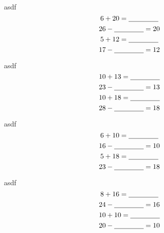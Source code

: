 \documentclass[letter, grid,frame,backs]{flashcards}
\begin{document}
\begin{flashcard}{asdf}
\Huge
\center
\vspace*{-0.8in}
\[ 6 + 20 = \underline{\hspace{1.5cm}} 
\]
\[
26 - \underline{\hspace{1.5cm}} = 20
\]\[ 5 + 12 = \underline{\hspace{1.5cm}} 
\]
\[
17 - \underline{\hspace{1.5cm}} = 12
\]
\end{flashcard}
\begin{flashcard}{asdf}
\Huge
\center
\vspace*{-0.8in}
\[ 10 + 13 = \underline{\hspace{1.5cm}} 
\]
\[
23 - \underline{\hspace{1.5cm}} = 13
\]\[ 10 + 18 = \underline{\hspace{1.5cm}} 
\]
\[
28 - \underline{\hspace{1.5cm}} = 18
\]
\end{flashcard}
\begin{flashcard}{asdf}
\Huge
\center
\vspace*{-0.8in}
\[ 6 + 10 = \underline{\hspace{1.5cm}} 
\]
\[
16 - \underline{\hspace{1.5cm}} = 10
\]\[ 5 + 18 = \underline{\hspace{1.5cm}} 
\]
\[
23 - \underline{\hspace{1.5cm}} = 18
\]
\end{flashcard}
\begin{flashcard}{asdf}
\Huge
\center
\vspace*{-0.8in}
\[ 8 + 16 = \underline{\hspace{1.5cm}} 
\]
\[
24 - \underline{\hspace{1.5cm}} = 16
\]\[ 10 + 10 = \underline{\hspace{1.5cm}} 
\]
\[
20 - \underline{\hspace{1.5cm}} = 10
\]
\end{flashcard}
\end{document}
